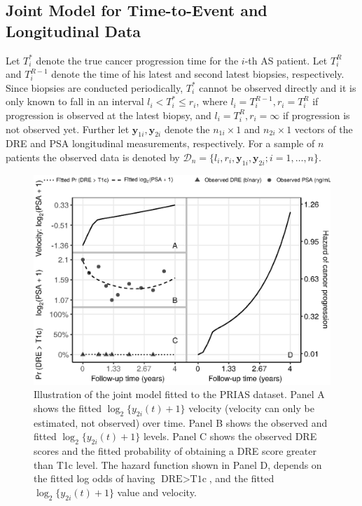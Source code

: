 \subsection{Joint Model for Time-to-Event and Longitudinal Data}
Let $T_i^*$ denote the true cancer progression time for the $i$-th AS patient. Let $T_i^R$ and $T_i^{R-1}$ denote the time of his latest and second latest biopsies, respectively. Since biopsies are conducted periodically, $T_i^*$ cannot be observed directly and it is only known to fall in an interval $l_i < T_i^* \leq r_i$, where $l_i = T_i^{R-1}, r_i = T_i^R$ if progression is observed at the latest biopsy, and $l_i = T_i^R, r_i=\infty$ if progression is not observed yet. Further let $\boldsymbol{y}_{1i}, \boldsymbol{y}_{2i}$ denote the $n_{1i} \times 1$ and $n_{2i} \times 1$ vectors of the DRE and PSA longitudinal measurements, respectively. For a sample of $n$ patients the observed data is denoted by $\mathcal{D}_n = \{l_i, r_i, \boldsymbol{y}_{1i}, \boldsymbol{y}_{2i}; i = 1, \ldots, n\}$.
\begin{figure}[!htb]
\captionsetup{justification=justified}
\centerline{\includegraphics[width=\columnwidth]{images/jmExplanationPlot_1757.eps}}
\caption{Illustration of the joint model fitted to the PRIAS dataset. Panel A shows the fitted $\log_2 \{y_{2i}(t) + 1\}$ velocity (velocity can only be estimated, not observed) over time. Panel B shows the observed and fitted $\log_2 \{y_{2i}(t) + 1\}$ levels. Panel C shows the observed DRE scores and the fitted probability of obtaining a DRE score greater than T1c level. The hazard function shown in Panel D, depends on the fitted log odds of having $\mbox{DRE} > \mbox{T1c}$, and the fitted $\log_2 \{y_{2i}(t) + 1\}$ value and velocity.}
\label{fig:jmExplanationPlot_1757}
\end{figure}

